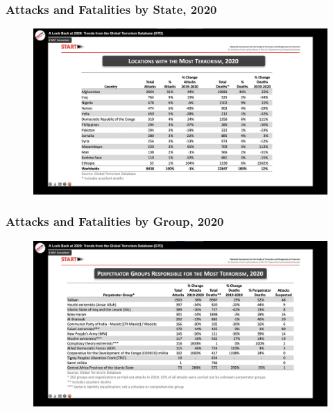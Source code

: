 \documentclass[handout]{beamer}
\begin{document}
\begin{frame} 
	\frametitle{\LARGE{Attacks and Fatalities by State, 2020}}
	\begin{figure}[ht!]
		\centering
		\includegraphics[width=\textwidth,height=\textheight,keepaspectratio]{terrorismlocations2020.png}
	\end{figure}
\end{frame}

\begin{frame} 
	\frametitle{\LARGE{Attacks and Fatalities by Group, 2020}}
	\begin{figure}[ht!]
		\centering
		\includegraphics[width=\textwidth,height=\textheight,keepaspectratio]{terrorismperp2020.png}
	\end{figure}
\end{frame}
\end{document}
